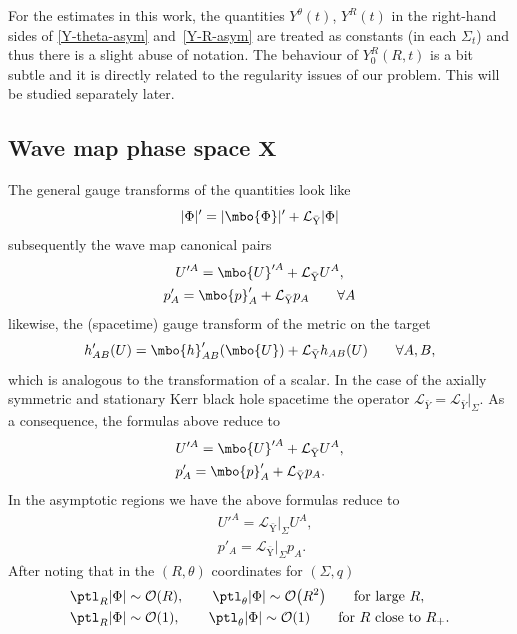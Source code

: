 For the estimates in this work, the quantities $Y^\theta (t)$, $Y^R (t) $ in the right-hand sides of \eqref{Y-theta-asym} and~\eqref{Y-R-asym} are treated as constants (in each $\Sigma_t$) and thus there is a slight abuse of notation. The behaviour of $Y^R_0 (R, t)$ is a bit subtle and it is directly related to the regularity issues of our problem. This will be studied separately later.

\subsection*{Wave map phase space $\boldsymbol{X}$}
The general gauge transforms of the quantities
look like
\[
\vert \Phi \vert' = \vert \mbo{\Phi} \vert' + \mathcal{L}_{\bar{\text{Y}}}\vert \Phi \vert
\]
subsequently the wave map canonical pairs
\begin{gather*}
U'^A = \mbo{U}'^A + \mathcal{L}_{\bar{\text{Y}}} U^A, \\
p'_A = \mbo{p}'_A + \mathcal{L}_{\bar{\text{Y}}} p_A \qquad \forall A
\end{gather*}
likewise, the (spacetime) gauge transform of the metric on the target
\[
h'_{AB} (U)= \mbo{h}'_{AB} (\mbo{U}) + \mathcal{L}_{\bar{\text{Y}}} h_{AB}(U) \qquad \forall A, B,
\]
which is analogous to the transformation of a scalar.
In the case of the axially symmetric and stationary Kerr black hole spacetime the operator $\mathcal{L}_{\bar{Y}} = \mathcal{L}_{\bar{Y}} \vert_{\Sigma}$. As a consequence, the formulas above reduce to
\begin{align*}
& U'^A= \mbo{U}'^A +\mathcal{L}_{\bar{\text{Y}}} U^A, \\
& p'_A= \mbo{p}'_A + \mathcal{L}_{\bar{\text{Y}}} p_A.
 \end{align*}
In the asymptotic regions we have the above formulas reduce to
\begin{align*}
&U'^A= \mathcal{L}_{\bar{\text{Y}}}\vert_{\Sigma} U^A, \\
&p'_A= \mathcal{L}_{\bar{\text{Y}}}\vert_{\Sigma} p_A.
\end{align*}
After noting that in the $(R, \theta)$ coordinates for $(\Sigma, q)$
\begin{align*}
&\ptl_R \vert \Phi \vert \sim \mathcal{O}(R), \qquad \ptl_\theta \vert \Phi \vert \sim \mathcal{O}\bigl(R^2\bigr) \qquad \text{for large $R$} , \\
& \ptl_R \vert \Phi \vert \sim \mathcal{O}(1), \qquad \ptl_\theta \vert \Phi \vert \sim \mathcal{O}(1) \qquad \text{for $R$ close to $R_+$}.
\end{align*}
